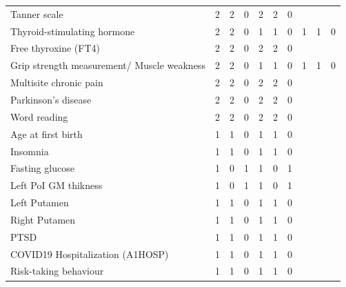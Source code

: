 \begin{table}[ht]
\begin{tabular}{lrrrrrrrrr}
  Tanner scale &   2 &   2 &   0 &   2 &   2 &   0 &  &  &  \\ 
  Thyroid-stimulating hormone &   2 &   2 &   0 &   1 &   1 &   0 &   1 &   1 &   0 \\ 
  Free thyroxine (FT4) &   2 &   2 &   0 &   2 &   2 &   0 &  &  &  \\ 
  Grip strength measurement/ Muscle weakness &   2 &   2 &   0 &   1 &   1 &   0 &   1 &   1 &   0 \\ 
  Multisite chronic pain &   2 &   2 &   0 &   2 &   2 &   0 &  &  &  \\ 
  Parkinson's disease &   2 &   2 &   0 &   2 &   2 &   0 &  &  &  \\ 
  Word reading &   2 &   2 &   0 &   2 &   2 &   0 &  &  &  \\ 
  Age at first birth &   1 &   1 &   0 &   1 &   1 &   0 &  &  &  \\ 
  Insomnia &   1 &   1 &   0 &   1 &   1 &   0 &  &  &  \\ 
  Fasting glucose &   1 &   0 &   1 &   1 &   0 &   1 &  &  &  \\ 
  Left PoI GM thikness &   1 &   0 &   1 &   1 &   0 &   1 &  &  &  \\ 
  Left Putamen &   1 &   1 &   0 &   1 &   1 &   0 &  &  &  \\ 
  Right Putamen &   1 &   1 &   0 &   1 &   1 &   0 &  &  &  \\ 
  PTSD &   1 &   1 &   0 &   1 &   1 &   0 &  &  &  \\ 
  COVID19 Hospitalization (A1HOSP) &   1 &   1 &   0 &   1 &   1 &   0 &  &  &  \\ 
  Risk-taking behaviour &   1 &   1 &   0 &   1 &   1 &   0 &  &  &  \\ 
   \hline
\end{tabular}
\end{table}

